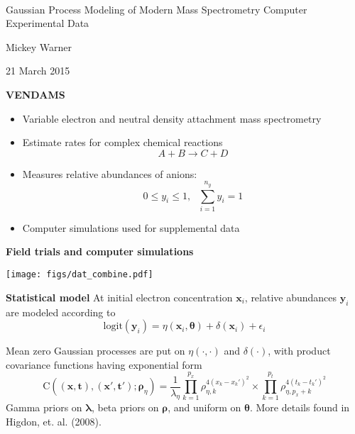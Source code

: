 \documentclass[mathserif, 11pt, t]{beamer}
\newcommand{\lra}{\longrightarrow}
\newcommand{\m}[1]{\mathbf{\bm{#1}}}
\renewcommand{\subtitle}[1]{\vspace{0.45cm}\textcolor{bluegreen}{
    {\textbf{#1}}}\vspace{0.15cm}\newline}
\begin{document}
\begin{center}
\ \\ [-0.5in]
\vfill
\bigskip
\bigskip
\bigskip
\bigskip
\bigskip

\begin{LARGE}
\begin{center}
Gaussian Process Modeling of Modern Mass Spectrometry Computer Experimental Data
\end{center}
\end{LARGE}
\vfill

\begin{center}
Mickey Warner
\end{center}
\vfill
21 March 2015
\bigskip
\bigskip
\bigskip
\vfill
\ \\ [-0.5in]
\end{center}

\begin{frame}
\subtitle{VENDAMS}
\begin{itemize}[label={$\cdot$}]
\item Variable electron and neutral density attachment mass spectrometry
\smallskip
\item Estimate rates for complex chemical reactions \[A+B\lra C+D\]
\item Measures relative abundances of anions: \[0\leq y_i \leq 1,~~~\sum_{i=1}^{n_y} y_i=1\]
\item Computer simulations used for supplemental data
\end{itemize}
\end{frame}

\begin{frame}
\subtitle{Field trials and computer simulations}
\begin{center}
\texttt{[image: figs/dat\_combine.pdf]}
\end{center}
\end{frame}

\begin{frame}
\subtitle{Statistical model}
At initial electron concentration $\m{x}_i$, relative abundances $\m{y}_i$ are modeled according to
\[\mathrm{logit}(\m{y}_i) = \eta(\m{x}_i, \m{\theta}) + \delta(\m{x}_i) + \epsilon_i\]

Mean zero Gaussian processes are put on $\eta(\cdot, \cdot)$ and $\delta(\cdot)$, with product covariance functions having exponential form
\[ \mathrm{C}((\m{x},\m{t}),(\m{x}',\m{t}'); \m{\rho}_\eta) = \frac{1}{\lambda_\eta}\prod_{k=1}^{p_x}\rho_{\eta,k}^{4(x_k-x_k')^2}\times\prod_{k=1}^{p_t}\rho_{\eta,p_x+k}^{4(t_k-t_k')^2} \]
Gamma priors on $\m{\lambda}$, beta priors on $\m{\rho}$, and uniform on $\m{\theta}$. More details found in Higdon, et. al. (2008).
\end{frame}
\end{document}
